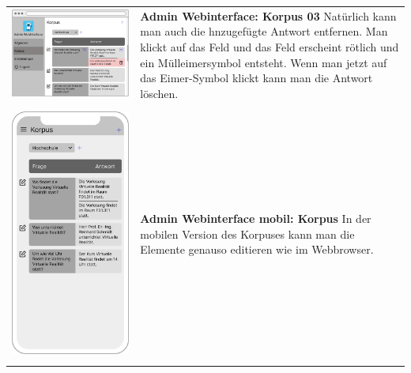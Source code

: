 \begin{tabular}{C{6cm}  L{7cm}}
    \includegraphics[width=\linewidth]{bilder/new vers. UI Design/Korpus/Admin Interface 03.png}       & \textbf{Admin Webinterface: Korpus 03} \newline
    Natürlich kann man auch die hnzugefügte Antwort entfernen. Man klickt auf das Feld und das Feld erscheint rötlich und ein
    Mülleimersymbol entsteht. Wenn man jetzt auf das Eimer-Symbol klickt kann man die
    Antwort löschen.                                                                                                                                         \\
    \includegraphics[width=5cm,height=8.5cm]{bilder/new vers. UI Design/Korpus/iPhone X Korpus I.png}  & \textbf{Admin Webinterface mobil: Korpus} \newline
    In der mobilen Version des Korpuses kann man die Elemente genauso editieren wie im Webbrowser.                                                           \\

\end{tabular}
